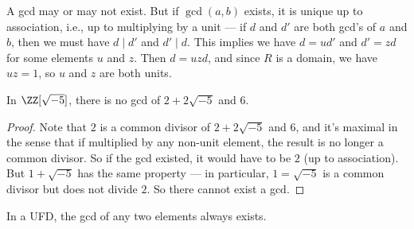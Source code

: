 A gcd may or may not exist. But if $\gcd(a, b)$ exists, it is unique up to association, i.e., up to multiplying by a unit --- if $d$ and $d'$ are both gcd's of $a$ and $b$, then we must have $d \mid d'$ and $d' \mid d$. This implies we have $d = ud'$ and $d' = zd$ for some elements $u$ and $z$. Then $d = uzd$, and since $R$ is a domain, we have $uz = 1$, so $u$ and $z$ are both units. %


\begin{example}
    In $\ZZ[\sqrt{-5}]$, there is no gcd of $2 + 2\sqrt{-5}$ and $6$. 
\end{example}

\begin{proof}
    Note that $2$ is a common divisor of $2 + 2\sqrt{-5}$ and $6$, and it's maximal in the sense that if multiplied by any non-unit element, the result is no longer a common divisor. So if the gcd existed, it would have to be $2$ (up to association). But $1 + \sqrt{-5}$ has the same property --- in particular, $1 = \sqrt{-5}$ is a common divisor but does not divide $2$. So there cannot exist a gcd. %
\end{proof}

\begin{proposition}
In a UFD, the gcd of any two elements always exists.
\end{proposition}


